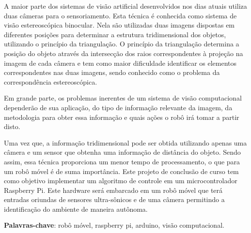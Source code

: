 
\begin{resumo}
A maior parte dos sistemas de visão artificial desenvolvidos nos dias atuais utiliza duas câmeras para o sensoriamento. Esta técnica é conhecida como sistema de visão estereoscópica binocular. Nela são utilizadas duas imagens dispostas em diferentes posições para determinar a estrutura tridimensional dos objetos, utilizando o princípio da triangulação. O princípio da triangulação determina a posição do objeto através da intersecção dos raios correspondentes à projeção na imagem de cada câmera e tem como maior dificuldade identificar os elementos correspondentes nas duas imagens, sendo conhecido como o problema da correspondência estereoscópica. 

Em grande parte, os problemas inerentes de um sistema de visão computacional dependerão de sua aplicação, do tipo de informação relevante da imagem, da metodologia para obter essa informação e quais ações o robô irá tomar a partir disto.

Uma vez que, a informação tridimensional pode ser obtida utilizando apenas uma câmera e um sensor que obtenha uma informação de distância do objeto. Sendo assim, essa técnica proporciona um menor tempo de processamento, o que para um robô móvel é de suma importância. Este projeto de conclusão de curso tem como objetivo implementar um algoritmo de controle em um microcontrolador Raspberry Pi. Este hardware será embarcado em um robô móvel que terá entradas oriundas de sensores ultra-sônicos e  de uma câmera permitindo a identificação do ambiente de maneira autônoma.

\vspace{\onelineskip}
\noindent
\textbf{Palavras-chave}: robô móvel, raspberry pi, arduino, visão computacional.
\end{resumo}

        


